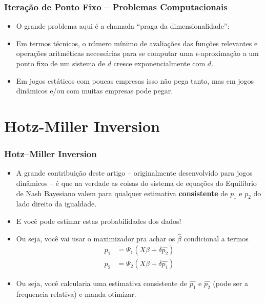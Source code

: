 \documentclass{beamer}
\begin{document}
\begin{frame}[fragile]\frametitle{Iteração de Ponto Fixo -- Problemas Computacionais}
    \begin{itemize}
    	\item O grande problema aqui é a chamada ``praga da dimensionalidade'':
    	\item Em termos técnicos, o número mínimo de avaliações das funções relevantes e operações aritméticas necessárias para se computar uma $\epsilon$-aproximação a um ponto fixo de um sistema de $d$ cresce exponencialmente com $d$.
    	\item Em jogos estáticos com poucas empresas isso não pega tanto, mas em jogos dinâmicos e/ou com muitas empresas pode pegar.
    \end{itemize}


\end{frame}

\section{Hotz-Miller Inversion}

\begin{frame}[fragile]\frametitle{Hotz--Miller Inversion}
\begin{itemize}
	\item A grande contribuição deste artigo -- originalmente desenvolvido para jogos dinâmicos -- é que na verdade as coisas do sistema de equações do Equilíbrio de Nash Bayesiano valem para qualquer estimativa \textbf{consistente} de $p_{1}$ e $p_{2}$ do lado direito da igualdade.
	\item E você pode estimar estas probabilidades dos dados!
	\item Ou seja, você vai usar o maximizador pra achar os $\hat{\beta}$ condicional a termos 
		\begin{align*}
		p_{1} &= \Psi_{1}(X\beta + \delta \hat{p_{2}}) \\
		p_{2} &= \Psi_{2}(X\beta + \delta \hat{p_{1}})
		\end{align*}
	\item Ou seja, você calcularia uma estimativa consistente de $\hat{p_{1}}$ e $\hat{p_{2}}$ (pode ser a frequencia relativa) e manda otimizar.

\end{itemize}
\end{frame}
\end{document}
